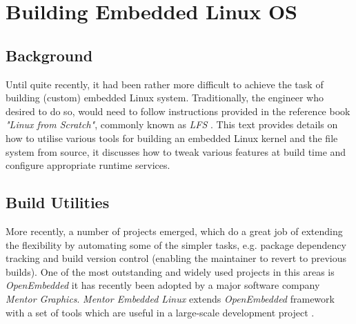 \section{Building Embedded Linux OS}

\subsection{Background}

  Until quite recently, it had been rather more difficult to achieve
 the task of building (custom) embedded Linux system. Traditionally,
 the engineer who desired to do so, would need to follow instructions
 provided in the reference book \emph{"Linux from Scratch"}, commonly
 known as \emph{LFS} \cite{book:lfs}. This text provides details on
 how to utilise various tools for building an embedded Linux kernel
 and the file system from source, it discusses how to tweak various
 features at build time and configure appropriate runtime services.

\subsection{Build Utilities}
 
  More recently, a number of projects emerged, which do a great job
 of extending the flexibility by automating some of the simpler
 tasks, e.g. package dependency tracking and build version control
 (enabling the maintainer to revert to previous builds).
 One of the most outstanding and widely used projects in this areas
 is \emph{OpenEmbedded} \cite{links:oe} it has recently been adopted
 by a major software company \emph{Mentor Graphics}. \emph{Mentor
 Embedded Linux} extends \emph{OpenEmbedded} framework with a set
 of tools which are useful in a large-scale development project
 \cite{links:mentor:linux}.
 
